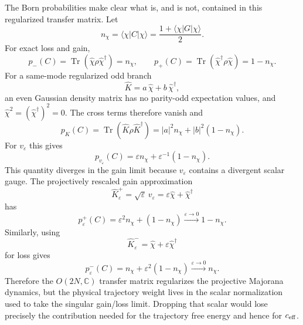 \documentclass[aps,prb,onecolumn,nofootinbib,superscriptaddress]{revtex4-2}
\newcommand{\Tr}{\operatorname{Tr}}
\newcommand{\ket}[1]{\lvert #1\rangle}
\newcommand{\bra}[1]{\langle #1\rvert}
\theoremstyle{plain}
\theoremstyle{definition}
\begin{document}
The Born probabilities make clear what is, and is not, contained in this
regularized transfer matrix.  Let
\begin{equation}
  n_\chi=\bra{\chi}C\ket{\chi}
  =
  \frac{1+\bra{\chi}G\ket{\chi}}{2}.
  \label{eq:n-chi-C-G}
\end{equation}
For exact loss and gain,
\begin{equation}
  p_-(C)
  =
  \Tr(\hat\chi\rho\hat\chi^\dagger)
  =
  n_\chi,
  \qquad
  p_+(C)
  =
  \Tr(\hat\chi^\dagger\rho\hat\chi)
  =
  1-n_\chi .
  \label{eq:exact-gain-loss-born}
\end{equation}
For a same-mode regularized odd branch
\begin{equation}
  \hat K=a\,\hat\chi+b\,\hat\chi^\dagger ,
  \label{eq:general-odd-same-mode-branch}
\end{equation}
an even Gaussian density matrix has no parity-odd expectation values, and
\(\hat\chi^2=(\hat\chi^\dagger)^2=0\).  The cross terms therefore vanish and
\begin{equation}
  p_K(C)
  =
  \Tr(\hat K\rho \hat K^\dagger)
  =
  |a|^2 n_\chi+|b|^2(1-n_\chi).
  \label{eq:regularized-odd-born-general}
\end{equation}
For \(v_\varepsilon\) this gives
\begin{equation}
  p_{v_\varepsilon}(C)
  =
  \varepsilon n_\chi+\varepsilon^{-1}(1-n_\chi).
  \label{eq:regularized-v-born}
\end{equation}
This quantity diverges in the gain limit because \(v_\varepsilon\) contains a
divergent scalar gauge.  The projectively rescaled gain approximation
\begin{equation}
  \hat K_\varepsilon^+
  =
  \sqrt{\varepsilon}\,v_\varepsilon
  =
  \varepsilon\hat\chi+\hat\chi^\dagger
  \label{eq:regularized-gain-K}
\end{equation}
has
\begin{equation}
  p_\varepsilon^+(C)
  =
  \varepsilon^2 n_\chi+(1-n_\chi)
  \xrightarrow{\varepsilon\to0}
  1-n_\chi .
  \label{eq:regularized-gain-born-limit}
\end{equation}
Similarly, using
\begin{equation}
  \hat K_\varepsilon^-
  =
  \hat\chi+\varepsilon\hat\chi^\dagger
  \label{eq:regularized-loss-K}
\end{equation}
for loss gives
\begin{equation}
  p_\varepsilon^-(C)
  =
  n_\chi+\varepsilon^2(1-n_\chi)
  \xrightarrow{\varepsilon\to0}
  n_\chi .
  \label{eq:regularized-loss-born-limit}
\end{equation}
Therefore the \(O(2N,\mathbb C)\) transfer matrix regularizes the projective
Majorana dynamics, but the physical trajectory weight lives in the scalar
normalization used to take the singular gain/loss limit.  Dropping that scalar
would lose precisely the contribution needed for the trajectory free energy
and hence for \(c_{\rm eff}\).
\end{document}
